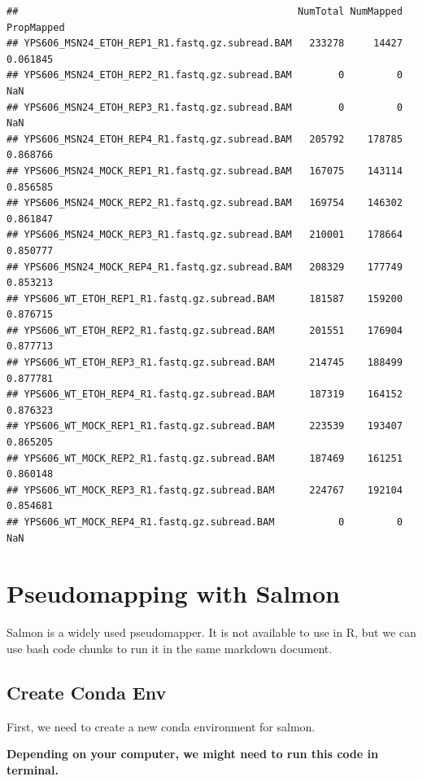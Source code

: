\documentclass[
]{book}
\begin{document}
\begin{verbatim}
##                                                NumTotal NumMapped PropMapped
## YPS606_MSN24_ETOH_REP1_R1.fastq.gz.subread.BAM   233278     14427   0.061845
## YPS606_MSN24_ETOH_REP2_R1.fastq.gz.subread.BAM        0         0        NaN
## YPS606_MSN24_ETOH_REP3_R1.fastq.gz.subread.BAM        0         0        NaN
## YPS606_MSN24_ETOH_REP4_R1.fastq.gz.subread.BAM   205792    178785   0.868766
## YPS606_MSN24_MOCK_REP1_R1.fastq.gz.subread.BAM   167075    143114   0.856585
## YPS606_MSN24_MOCK_REP2_R1.fastq.gz.subread.BAM   169754    146302   0.861847
## YPS606_MSN24_MOCK_REP3_R1.fastq.gz.subread.BAM   210001    178664   0.850777
## YPS606_MSN24_MOCK_REP4_R1.fastq.gz.subread.BAM   208329    177749   0.853213
## YPS606_WT_ETOH_REP1_R1.fastq.gz.subread.BAM      181587    159200   0.876715
## YPS606_WT_ETOH_REP2_R1.fastq.gz.subread.BAM      201551    176904   0.877713
## YPS606_WT_ETOH_REP3_R1.fastq.gz.subread.BAM      214745    188499   0.877781
## YPS606_WT_ETOH_REP4_R1.fastq.gz.subread.BAM      187319    164152   0.876323
## YPS606_WT_MOCK_REP1_R1.fastq.gz.subread.BAM      223539    193407   0.865205
## YPS606_WT_MOCK_REP2_R1.fastq.gz.subread.BAM      187469    161251   0.860148
## YPS606_WT_MOCK_REP3_R1.fastq.gz.subread.BAM      224767    192104   0.854681
## YPS606_WT_MOCK_REP4_R1.fastq.gz.subread.BAM           0         0        NaN
\end{verbatim}

\hypertarget{pseudomapping-with-salmon}{%
\section{Pseudomapping with Salmon}\label{pseudomapping-with-salmon}}

Salmon is a widely used pseudomapper. It is not available to use in R, but we can use bash code chunks to run it in the same markdown document.

\hypertarget{create-conda-env}{%
\subsection{Create Conda Env}\label{create-conda-env}}

First, we need to create a new conda environment for salmon.

\textbf{Depending on your computer, we might need to run this code in terminal.}
\end{document}

